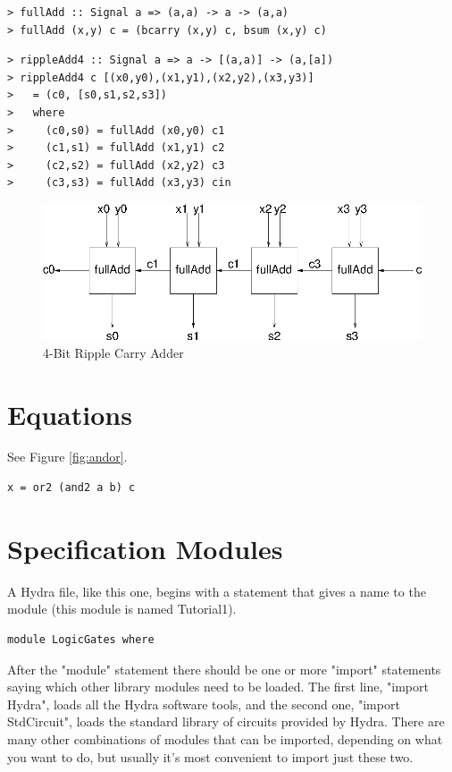 \documentclass[a4paper,openany,fleqn]{book}
\begin{document}
\begin{verbatim}
> fullAdd :: Signal a => (a,a) -> a -> (a,a)
> fullAdd (x,y) c = (bcarry (x,y) c, bsum (x,y) c)
\end{verbatim}

\begin{verbatim}
> rippleAdd4 :: Signal a => a -> [(a,a)] -> (a,[a])
> rippleAdd4 c [(x0,y0),(x1,y1),(x2,y2),(x3,y3)]
>   = (c0, [s0,s1,s2,s3])
>   where
>     (c0,s0) = fullAdd (x0,y0) c1
>     (c1,s1) = fullAdd (x1,y1) c2
>     (c2,s2) = fullAdd (x2,y2) c3
>     (c3,s3) = fullAdd (x3,y3) cin
\end{verbatim}

\begin{figure}[htbp]
  \begin{center}
    \includegraphics{../figures/xfig/rippleAdd4.eps}
    \caption{4-Bit Ripple Carry Adder}
    \label{fig:rippleAdd4}
  \end{center}
\end{figure}

\section{Equations}
\label{sec:equations}

See Figure \ref{fig:andor}.
\begin{verbatim}
x = or2 (and2 a b) c
\end{verbatim}

\section{Specification Modules}
\label{sec:spec-modules}

A Hydra file, like this one, begins with a statement that gives a name
to the module (this module is named Tutorial1).

\begin{verbatim}
module LogicGates where
\end{verbatim}

After the "module" statement there should be one or more "import"
statements saying which other library modules need to be loaded.  The
first line, "import Hydra", loads all the Hydra software tools, and
the second one, "import StdCircuit", loads the standard library of
circuits provided by Hydra.  There are many other combinations of
modules that can be imported, depending on what you want to do, but
usually it's most convenient to import just these two.
\end{document}
